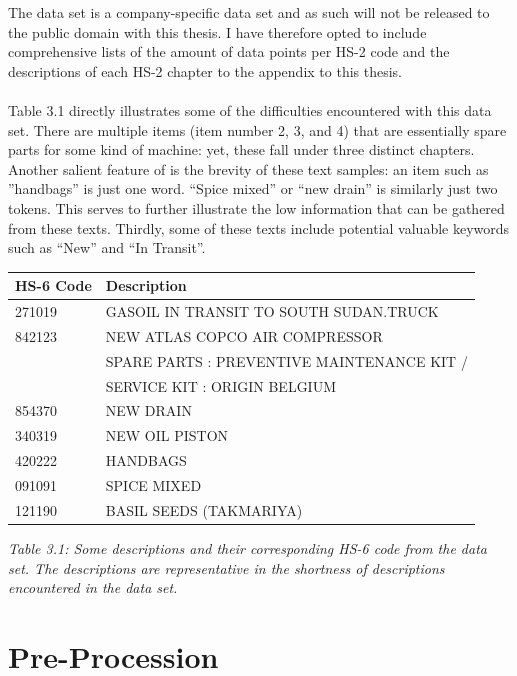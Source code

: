 The data set is a company-specific data set and as such will not be released to the public domain with this thesis. I have therefore opted to include comprehensive lists of the amount of data points per HS-2 code and the descriptions of each HS-2 chapter to the appendix to this thesis.\\
\\
Table 3.1 directly illustrates some of the difficulties encountered with this data set. There are multiple items (item number 2, 3, and 4) that are essentially spare parts for some kind of machine: yet, these fall under three distinct chapters. Another salient feature of is the brevity of these text samples: an item such as ”handbags” is just one word. “Spice mixed” or “new drain” is similarly just two tokens. This serves to further illustrate the low information that can be gathered from these texts. Thirdly, some of these texts include potential valuable keywords such as “New” and “In Transit”.



\begin{center}
    \begin{tabular}{ll} \hline
HS-6 Code & Description  \\ \hline
271019 & GASOIL IN TRANSIT TO SOUTH SUDAN.TRUCK \\
842123 & NEW ATLAS COPCO AIR COMPRESSOR \\
& SPARE PARTS : PREVENTIVE MAINTENANCE KIT / \\
& SERVICE KIT : ORIGIN BELGIUM\\
854370 & NEW DRAIN\\
340319 & NEW OIL PISTON\\
420222 & HANDBAGS\\
091091 & SPICE MIXED\\
121190 & BASIL SEEDS (TAKMARIYA)\\ \hline
	\end{tabular}
\end{center}
{\textit{Table 3.1: Some descriptions and their corresponding HS-6 code from the data set. 
The descriptions are representative in the shortness of descriptions encountered in the data set.}} \\


\section{Pre-Procession}

